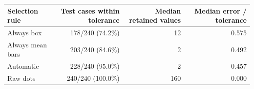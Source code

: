 \begin{tabular}{lrrr}\toprule Selection rule & Test cases within tolerance & Median retained values & Median error / tolerance\\\midrule
Always box & 178/240 (74.2\%) & 12 & 0.575\\
Always mean bars & 203/240 (84.6\%) & 2 & 0.492\\
Automatic & 228/240 (95.0\%) & 2 & 0.457\\
Raw dots & 240/240 (100.0\%) & 160 & 0.000\\
\bottomrule\end{tabular}